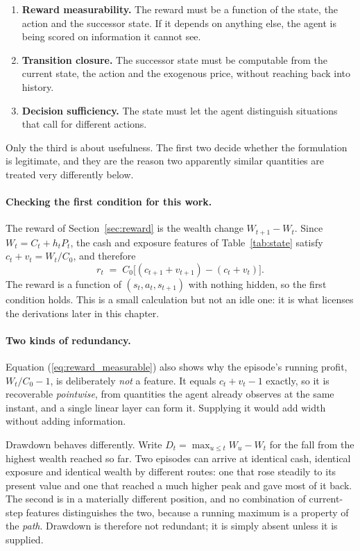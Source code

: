 \begin{enumerate}
  \item \textbf{Reward measurability.} The reward must be a function of
        the state, the action and the successor state. If it depends on
        anything else, the agent is being scored on information it cannot
        see.
  \item \textbf{Transition closure.} The successor state must be
        computable from the current state, the action and the exogenous
        price, without reaching back into history.
  \item \textbf{Decision sufficiency.} The state must let the agent
        distinguish situations that call for different actions.
\end{enumerate}

Only the third is about usefulness. The first two decide whether the
formulation is legitimate, and they are the reason two apparently similar
quantities are treated very differently below.

\paragraph{Checking the first condition for this work.} The reward of
Section~\ref{sec:reward} is the wealth change $W_{t+1} - W_t$. Since
$W_t = C_t + h_t P_t$, the cash and exposure features of
Table~\ref{tab:state} satisfy $c_t + v_t = W_t / C_0$, and therefore
\begin{equation}
r_t \;=\; C_0\big[(c_{t+1} + v_{t+1}) - (c_t + v_t)\big].
\label{eq:reward_measurable}
\end{equation}
The reward is a function of $(s_t, a_t, s_{t+1})$ with nothing hidden, so
the first condition holds. This is a small calculation but not an idle
one: it is what licenses the derivations later in this chapter.

\paragraph{Two kinds of redundancy.} Equation
(\ref{eq:reward_measurable}) also shows why the episode's running profit,
$W_t/C_0 - 1$, is deliberately \emph{not} a feature. It equals
$c_t + v_t - 1$ exactly, so it is recoverable \emph{pointwise}, from
quantities the agent already observes at the same instant, and a single
linear layer can form it. Supplying it would add width without adding
information.

Drawdown behaves differently. Write
$D_t = \max_{u \le t} W_u - W_t$ for the fall from the highest wealth
reached so far. Two episodes can arrive at identical cash, identical
exposure and identical wealth by different routes: one that rose steadily
to its present value and one that reached a much higher peak and gave
most of it back. The second is in a materially different position, and no
combination of current-step features distinguishes the two, because a
running maximum is a property of the \emph{path}. Drawdown is therefore
not redundant; it is simply absent unless it is supplied.

